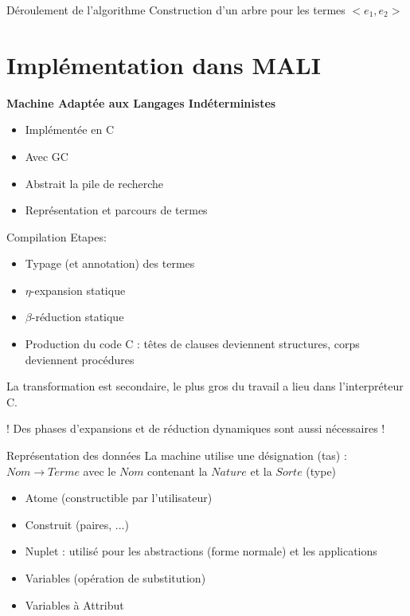 \documentclass[aspectratio=169]{beamer}
\begin{document}
\begin{frame}{Déroulement de l'algorithme}
  Construction d'un arbre pour les termes $<e_1, e_2>$
  \begin{algorithmic}
    \EndWhile
    \EndProcedure
  \end{algorithmic}
\end{frame}

\section{Implémentation dans MALI}

\begin{frame}
  \textbf{Machine Adaptée aux Langages Indéterministes}
  \begin{itemize}
    \item Implémentée en C
    \item Avec GC
    \item Abstrait la pile de recherche
    \item Représentation et parcours de termes
  \end{itemize}
\end{frame}

\begin{frame}{Compilation}
  Etapes:
  \begin{itemize}
  \item Typage (et annotation) des termes
  \item $\eta$-expansion statique
  \item $\beta$-réduction statique
  \item Production du code C : têtes de clauses deviennent structures, corps deviennent procédures
  \end{itemize}
  La transformation est secondaire, le plus gros du travail a lieu dans l'interpréteur C.

  ! Des phases d'expansions et de réduction dynamiques sont aussi nécessaires !
\end{frame}

\begin{frame}{Représentation des données}
  La machine utilise une désignation (tas) : $Nom \rightarrow Terme$
  avec le $Nom$ contenant la $Nature$ et la $Sorte$ (type)
  \begin{itemize}
  \item Atome (constructible par l'utilisateur)
  \item Construit (paires, ...)
  \item Nuplet : utilisé pour les abstractions (forme normale) et les applications
  \item Variables (opération de substitution)
  \item Variables à Attribut
  \end{itemize}
\end{frame}
\end{document}
